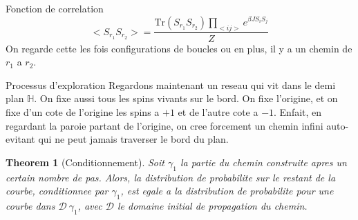 \documentclass[a4paper]{book}
\newtheorem{theorem}{Theorem}[section]
\theoremstyle{definition}
\theoremstyle{remark}
\begin{document}
Fonction de correlation
\begin{equation}
    <S_{r_1} S_{r_2}> = \frac{\text{Tr}(S_{r_1} S_{r_2})\prod _{<ij>}e^{\beta J S_i S_j}}{Z}
\end{equation}
On regarde cette les fois configurations de boucles ou en plus, il y a un chemin de $r_1$ a $r_2$. \par \medskip 

Processus d'exploration\newline 
Regardons maintenant un reseau qui vit dans le demi plan $\mathbb{H}$. On fixe aussi tous les spins vivants sur le bord. On fixe l'origine, et on fixe d'un cote de l'origine les spins a $+1$ et de l'autre cote a $-1$. Enfait, en regardant la paroie partant de l'origine, on cree forcement un chemin infini auto-evitant qui ne peut jamais traverser le bord du plan. 

\begin{theorem}[Conditionnement] Soit $\gamma_1$ la partie du chemin construite apres un certain nombre de pas. Alors, la distribution de probabilite sur le restant de la courbe, conditionnee par $\gamma_1$, est egale a la distribution de probabilite pour une courbe dans $\mathcal D \ \gamma_1$, avec $\mathcal{D}$ le domaine initial de propagation du chemin.
\end{theorem}
\end{document}
